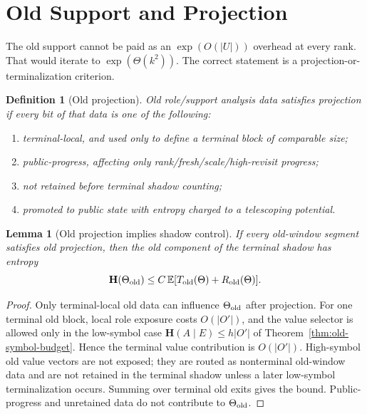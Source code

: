 \documentclass[11pt]{article}
\newtheorem{lemma}[theorem]{Lemma}
\newtheorem{definition}[theorem]{Definition}
\newcommand{\EE}{\mathbb E}
\newcommand{\bfH}{\mathbf H}
\begin{document}
\section{Old Support and Projection}
\label{sec:old}

The old support cannot be paid as an $\exp(O(|U|))$ overhead at every rank.
That would iterate to $\exp(\Theta(k^2))$.  The correct statement is a
projection-or-terminalization criterion.

\begin{definition}[Old projection]
Old role/support analysis data satisfies projection if every bit of that data is
one of the following:
\begin{enumerate}[label=\textup{(\roman*)}]
\item terminal-local, and used only to define a terminal block of comparable
size;
\item public-progress, affecting only rank/fresh/scale/high-revisit progress;
\item not retained before terminal shadow counting;
\item promoted to public state with entropy charged to a telescoping
potential.
\end{enumerate}
\end{definition}

\begin{lemma}[Old projection implies shadow control]
\label{lem:old-projection}
If every old-window segment satisfies old projection, then the old component of the
terminal shadow has entropy
\[
  \bfH(\Theta_{\rm old})
  \le C\,\EE[T_{\rm old}(\Theta)+R_{\rm old}(\Theta)].
\]
\end{lemma}

\begin{proof}
Only terminal-local old data can influence $\Theta_{\rm old}$ after
projection.  For one terminal old block, local role exposure costs $O(|O'|)$,
and the value selector is allowed only in the low-symbol case
$\bfH(A\mid E)\le h|O'|$ of Theorem~\ref{thm:old-symbol-budget}.  Hence the
terminal value contribution is $O(|O'|)$.  High-symbol old value vectors are
not exposed; they are routed as nonterminal old-window data and are not
retained in the terminal shadow unless a later low-symbol terminalization
occurs.  Summing over terminal old exits gives the bound.  Public-progress
and unretained data do not contribute to $\Theta_{\rm old}$.
\end{proof}
\end{document}
